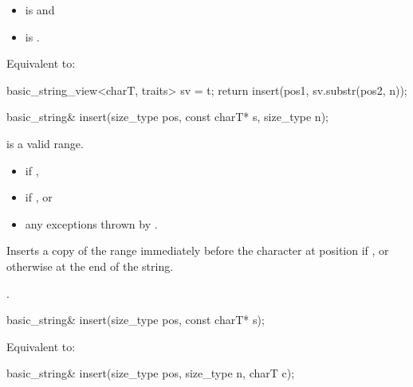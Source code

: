 \begin{itemdescr}
\pnum
\constraints
\begin{itemize}
\item
{} is
 and
\item
{} is
.
\end{itemize}

\pnum
\effects Equivalent to:
\begin{codeblock}
basic_string_view<charT, traits> sv = t;
return insert(pos1, sv.substr(pos2, n));
\end{codeblock}
\end{itemdescr}

%
\begin{itemdecl}
basic_string& insert(size_type pos, const charT* s, size_type n);
\end{itemdecl}

\begin{itemdescr}
\pnum
\expects {} is a valid range.

\pnum
\throws
\begin{itemize}
\item {} if ,
\item {} if , or
\item any exceptions thrown by .
\end{itemize}

\pnum
\effects Inserts a copy of the range 
immediately before the character at position  if ,
or otherwise at the end of the string.

\pnum
\returns
{}.
\end{itemdescr}

%
\begin{itemdecl}
basic_string& insert(size_type pos, const charT* s);
\end{itemdecl}

\begin{itemdescr}
\pnum
\effects Equivalent to: 
\end{itemdescr}

%
\begin{itemdecl}
basic_string& insert(size_type pos, size_type n, charT c);
\end{itemdecl}

